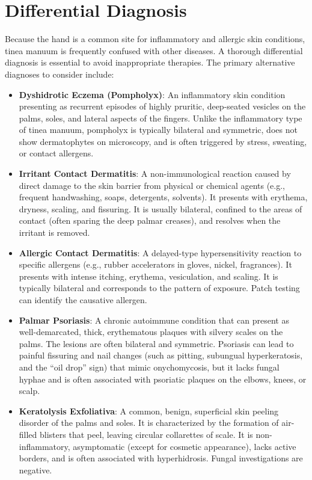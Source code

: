 \section*{Differential Diagnosis}
Because the hand is a common site for inflammatory and allergic skin conditions, tinea manuum is frequently confused with other diseases. A thorough differential diagnosis is essential to avoid inappropriate therapies. The primary alternative diagnoses to consider include:

\begin{itemize}
    \item \textbf{Dyshidrotic Eczema (Pompholyx)}: An inflammatory skin condition presenting as recurrent episodes of highly pruritic, deep-seated vesicles on the palms, soles, and lateral aspects of the fingers. Unlike the inflammatory type of tinea manuum, pompholyx is typically bilateral and symmetric, does not show dermatophytes on microscopy, and is often triggered by stress, sweating, or contact allergens.
    \item \textbf{Irritant Contact Dermatitis}: A non-immunological reaction caused by direct damage to the skin barrier from physical or chemical agents (e.g., frequent handwashing, soaps, detergents, solvents). It presents with erythema, dryness, scaling, and fissuring. It is usually bilateral, confined to the areas of contact (often sparing the deep palmar creases), and resolves when the irritant is removed.
    \item \textbf{Allergic Contact Dermatitis}: A delayed-type hypersensitivity reaction to specific allergens (e.g., rubber accelerators in gloves, nickel, fragrances). It presents with intense itching, erythema, vesiculation, and scaling. It is typically bilateral and corresponds to the pattern of exposure. Patch testing can identify the causative allergen.
    \item \textbf{Palmar Psoriasis}: A chronic autoimmune condition that can present as well-demarcated, thick, erythematous plaques with silvery scales on the palms. The lesions are often bilateral and symmetric. Psoriasis can lead to painful fissuring and nail changes (such as pitting, subungual hyperkeratosis, and the ``oil drop'' sign) that mimic onychomycosis, but it lacks fungal hyphae and is often associated with psoriatic plaques on the elbows, knees, or scalp.
    \item \textbf{Keratolysis Exfoliativa}: A common, benign, superficial skin peeling disorder of the palms and soles. It is characterized by the formation of air-filled blisters that peel, leaving circular collarettes of scale. It is non-inflammatory, asymptomatic (except for cosmetic appearance), lacks active borders, and is often associated with hyperhidrosis. Fungal investigations are negative.

\end{itemize}
